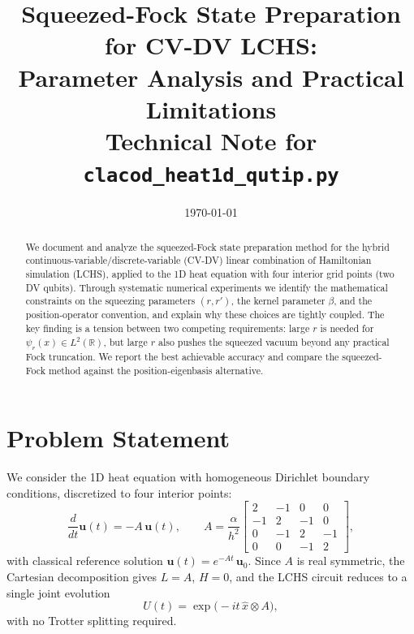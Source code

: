 \documentclass[11pt]{article}
\title{Squeezed-Fock State Preparation for CV-DV LCHS:\\
Parameter Analysis and Practical Limitations\\[4pt]
\large Technical Note for \texttt{clacod\_heat1d\_qutip.py}}
\author{}
\date{\today}
\begin{document}
\maketitle

\begin{abstract}
We document and analyze the squeezed-Fock state preparation method for the
hybrid continuous-variable/discrete-variable (CV-DV) linear combination of
Hamiltonian simulation (LCHS), applied to the 1D heat equation with four
interior grid points (two DV qubits).
Through systematic numerical experiments we identify the mathematical
constraints on the squeezing parameters $(r, r')$, the kernel parameter
$\beta$, and the position-operator convention, and explain why these choices
are tightly coupled.
The key finding is a tension between two competing requirements: large $r$
is needed for $\psi_r(x) \in L^2(\mathbb{R})$, but large $r$ also pushes the
squeezed vacuum beyond any practical Fock truncation.
We report the best achievable accuracy and compare the squeezed-Fock method
against the position-eigenbasis alternative.
\end{abstract}

\section{Problem Statement}

We consider the 1D heat equation with homogeneous Dirichlet boundary conditions,
discretized to four interior points:
\begin{equation}\label{eq:ode}
  \frac{d}{dt}\mathbf{u}(t) = -A\,\mathbf{u}(t), \qquad
  A = \frac{\alpha}{h^2}
  \begin{bmatrix}
    2 & -1 & 0 & 0 \\
    -1 & 2 & -1 & 0 \\
    0 & -1 & 2 & -1 \\
    0 & 0 & -1 & 2
  \end{bmatrix},
\end{equation}
with classical reference solution $\mathbf{u}(t) = e^{-At}\,\mathbf{u}_0$.
Since $A$ is real symmetric, the Cartesian decomposition gives $L = A$, $H = 0$,
and the LCHS circuit reduces to a single joint evolution
\begin{equation}\label{eq:joint}
  U(t) = \exp\!\bigl(-it\,\hat{x}\otimes A\bigr),
\end{equation}
with no Trotter splitting required.
\end{document}
